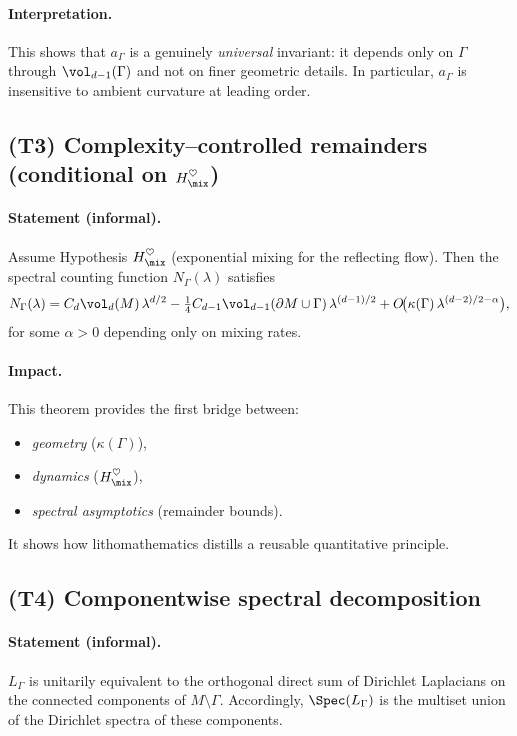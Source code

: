 \paragraph{Interpretation.}
This shows that $a_\Gamma$ is a genuinely \emph{universal} invariant: 
it depends only on $\Gamma$ through $\vol_{d-1}(\Gamma)$ 
and not on finer geometric details. 
In particular, $a_\Gamma$ is insensitive to ambient curvature at leading order.

\subsection{(T3) Complexity–controlled remainders (conditional on $H_{\mix}^\heartsuit$)}

\paragraph{Statement (informal).}
Assume Hypothesis $H_{\mix}^\heartsuit$ (exponential mixing for the reflecting flow). 
Then the spectral counting function $N_\Gamma(\lambda)$ satisfies
\[
N_\Gamma(\lambda)
= C_d \vol_d(M)\, \lambda^{d/2}
- \tfrac14 C_{d-1}\vol_{d-1}(\partial M\cup\Gamma)\, \lambda^{(d-1)/2}
+ O\!\big(\kappa(\Gamma)\,\lambda^{(d-2)/2-\alpha}\big),
\]
for some $\alpha>0$ depending only on mixing rates.

\paragraph{Impact.}
This theorem provides the first bridge between:
\begin{itemize}
  \item \emph{geometry} ($\kappa(\Gamma)$),
  \item \emph{dynamics} ($H_{\mix}^\heartsuit$),
  \item \emph{spectral asymptotics} (remainder bounds).
\end{itemize}
It shows how lithomathematics distills a reusable quantitative principle.

\subsection{(T4) Componentwise spectral decomposition}

\paragraph{Statement (informal).}
$L_\Gamma$ is unitarily equivalent to the orthogonal direct sum 
of Dirichlet Laplacians on the connected components of $M\setminus \Gamma$.
Accordingly, $\Spec(L_\Gamma)$ is the multiset union of the Dirichlet spectra 
of these components.

